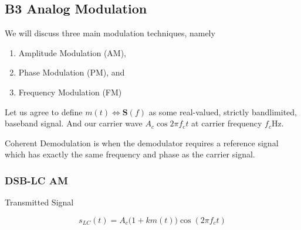 \documentclass[../../main.tex]{subfiles}
\begin{document}
\newcommand{\pmf}{P_{\mathbf{S}}(f)}
\newcommand{\hf}{\mathbf{H}(f)}
\newcommand{\mf}{\mathbf{S}(f)}
\subsection{B3 Analog Modulation}
We will discuss three main modulation techniques, namely
\begin{enumerate}
    \item Amplitude Modulation (AM),
    \item Phase Modulation (PM), and
    \item Frequency Modulation (FM)
\end{enumerate}
Let us agree to define $m(t)\iff \mf$ as some real-valued, strictly bandlimited, baseband signal. And our carrier wave $A_c\cos{2\pi f_c t}$ at carrier frequency $f_c$Hz.
\begin{definition}
    Coherent Demodulation is when the demodulator requires a reference signal which has exactly the same frequency and phase as the carrier signal.
\end{definition}
\subsubsection{DSB-LC AM}
Transmitted Signal

\begin{equation}\label{DSB-LC time domain}
    s_{LC}(t) = A_c\biggl(1+km(t)\biggr)\cos(2\pi f_c t)
\end{equation}
\end{document}
